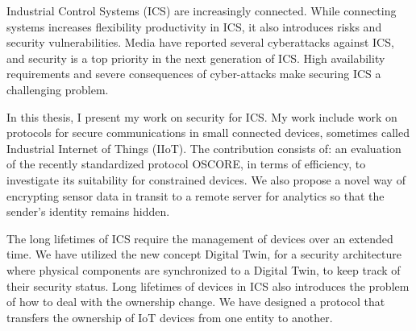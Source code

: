 Industrial Control Systems (ICS) are increasingly connected. While connecting systems increases flexibility productivity in ICS, it also introduces risks and security vulnerabilities. Media have reported several cyberattacks against ICS, and security is a top priority in the next generation of ICS. High availability requirements and severe consequences of cyber-attacks make securing ICS a challenging problem.

In this thesis, I present my work on security for ICS. My work include work on protocols for secure communications in small connected devices, sometimes called Industrial Internet of Things (IIoT). The contribution consists of: an evaluation of the recently standardized protocol OSCORE, in terms of efficiency, to investigate its suitability for constrained devices.
We also propose a novel way of encrypting sensor data in transit to a remote server for analytics so that the sender's identity remains hidden. 

The long lifetimes of ICS require the management of devices over an extended time. We have utilized the new concept Digital Twin, for a security architecture where physical components are synchronized to a Digital Twin, to keep track of their security status. 
Long lifetimes of devices in ICS also introduces the problem of how to deal with the ownership change. We have designed a protocol that transfers the ownership of IoT devices from one entity to another.